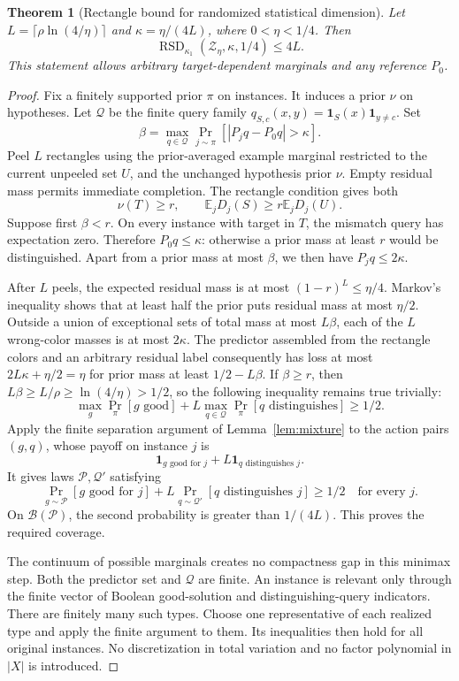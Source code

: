 \documentclass[11pt]{article}
\newtheorem{theorem}{Theorem}
\DeclareMathOperator{\RSD}{RSD}
\newcommand{\E}{\mathbb E}
\newcommand{\1}{\mathbf 1}
\begin{document}
\begin{samepage}
\begin{theorem}[Rectangle bound for randomized statistical dimension]\label{thm:rsd}
Let $L=\lceil\rho\ln(4/\eta)\rceil$ and $\kappa=\eta/(4L)$, where $0<\eta<1/4$. Then
\[
 \RSD_{\kappa_1}(\mathcal Z_\eta,\kappa,1/4)\le4L.
\]
This statement allows arbitrary target-dependent marginals and any reference $P_0$.
\end{theorem}
\end{samepage}
\begin{proof}
Fix a finitely supported prior $\pi$ on instances. It induces a prior $\nu$ on hypotheses. Let $\mathcal Q$ be the finite query family $q_{S,c}(x,y)=\1_S(x)\1_{y\ne c}$. Set
\[
 \beta=\max_{q\in\mathcal Q}\Pr_{j\sim\pi}[|P_jq-P_0q|>\kappa].
\]
Peel $L$ rectangles using the prior-averaged example marginal restricted to the current unpeeled set $U$, and the unchanged hypothesis prior $\nu$. Empty residual mass permits immediate completion. The rectangle condition gives both
\[
 \nu(T)\ge r,\qquad \E_jD_j(S)\ge r\E_jD_j(U).
\]
Suppose first $\beta<r$. On every instance with target in $T$, the mismatch query has expectation zero. Therefore $P_0q\le\kappa$: otherwise a prior mass at least $r$ would be distinguished. Apart from a prior mass at most $\beta$, we then have $P_jq\le2\kappa$.

After $L$ peels, the expected residual mass is at most $(1-r)^L\le\eta/4$. Markov's inequality shows that at least half the prior puts residual mass at most $\eta/2$. Outside a union of exceptional sets of total mass at most $L\beta$, each of the $L$ wrong-color masses is at most $2\kappa$. The predictor assembled from the rectangle colors and an arbitrary residual label consequently has loss at most $2L\kappa+\eta/2=\eta$ for prior mass at least $1/2-L\beta$. If $\beta\ge r$, then $L\beta\ge L/\rho\ge\ln(4/\eta)>1/2$, so the following inequality remains true trivially:
\begin{equation}\label{eq:additive-game}
 \max_g\Pr_\pi[g\text{ good}]+L\max_{q\in\mathcal Q}\Pr_\pi[q\text{ distinguishes}]\ge1/2.
\end{equation}
Apply the finite separation argument of Lemma~\ref{lem:mixture} to the action pairs $(g,q)$, whose payoff on instance $j$ is
\[
 \1_{g\text{ good for }j}+L\1_{q\text{ distinguishes }j}.
\]
It gives laws $\mathcal P,\mathcal Q'$ satisfying
\[
 \Pr_{g\sim\mathcal P}[g\text{ good for }j]
 +L\Pr_{q\sim\mathcal Q'}[q\text{ distinguishes }j]\ge1/2
 \quad\text{for every }j.
\]
On $\mathcal B(\mathcal P)$, the second probability is greater than $1/(4L)$. This proves the required coverage.

The continuum of possible marginals creates no compactness gap in this minimax step. Both the predictor set and $\mathcal Q$ are finite. An instance is relevant only through the finite vector of Boolean good-solution and distinguishing-query indicators. There are finitely many such types. Choose one representative of each realized type and apply the finite argument to them. Its inequalities then hold for all original instances. No discretization in total variation and no factor polynomial in $|X|$ is introduced.
\end{proof}
\end{document}
